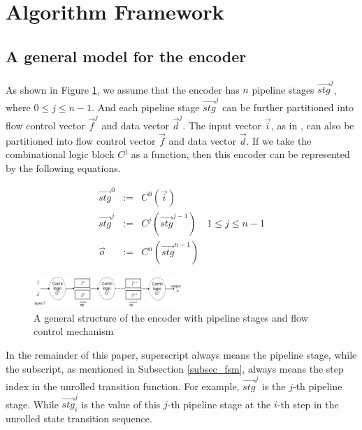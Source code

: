 \documentclass[conference]{IEEEtran}
\begin{document}
\section{Algorithm Framework}\label{sec_framework}


\subsection{A general model for the encoder}
As shown in Figure \ref{fig_pipeenc},
we assume that 
the encoder has $n$ pipeline stages $\vec{stg}^j$,
where $0\le j \le n-1$.
And each pipeline stage $\vec{stg}^j$ can be further partitioned into flow control vector $\vec{f}^j$ and data vector $\vec{d}^j$.
The input vector $\vec{i}$,
as in \cite{QinTODAES15},
can also be partitioned into flow control vector $\vec{f}$ and data vector $\vec{d}$.
If we take the combinational logic block $C^j$ as a function,
then this encoder can be represented by the following equations.

\begin{equation}\label{equ_genpipe}
\begin{array}{cccc}
\vec{stg}^0   & := & C^0(\vec{i})         &\\
\vec{stg}^j   & := & C^j(\vec{stg}^{j-1}) & 1\le j\le n-1\\
\vec{o}       & := & C^n(\vec{stg}^{n-1}) &
\end{array}
\end{equation}


\begin{figure}[b]
\begin{center}
\includegraphics[width=0.5\textwidth]{pipemod1}
\end{center}
\caption{A general structure of the encoder with pipeline stages and flow control mechanism}
  \label{fig_pipeenc}
\end{figure}



In the remainder of this paper,
superscript always means the pipeline stage,
while the subscript,
as mentioned in Subsection \ref{subsec_fsm},
always means the step index in the unrolled transition function.
For example,
$\vec{stg}^j$ is the $j$-th pipeline stage.
While $\vec{stg}^j_i$ is the value of this $j$-th pipeline stage 
at the $i$-th step in the unrolled state transition sequence.
\end{document}
